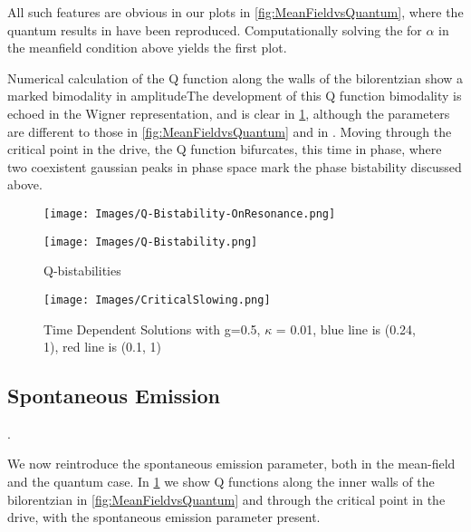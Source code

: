 All such features are obvious in our plots in \cref{fig:MeanFieldvsQuantum}, where the quantum results in \cite{Carmichael2015} have been reproduced. Computationally solving the for $\alpha$ in the meanfield condition above yields the first plot.

Numerical calculation of the Q function along the walls of the bilorentzian show a marked bimodality in amplitudeThe development of this Q function bimodality is echoed in the Wigner representation, and is clear in \cref{fig:Qbistabilities}, although the parameters are different to those in \cref{fig:MeanFieldvsQuantum} and in \autocite{Carmichael2015}. Moving through the critical point in the drive, the Q function bifurcates, this time in phase, where two coexistent gaussian peaks in phase space mark the phase bistability discussed above.
\begin{figure}[h]
 \begin{minipage}{.5\linewidth}
  \centering
  \texttt{[image: Images/Q-Bistability-OnResonance.png]}
  \end{minipage}%
  \begin{minipage}{.5\linewidth}
      \centering
      \texttt{[image: Images/Q-Bistability.png]}
  \end{minipage}
  \caption{Q-bistabilities}\label{fig:Qbistabilities}
\end{figure}

\begin{figure}[h]
  \centering
  \texttt{[image: Images/CriticalSlowing.png]}
  \caption{Time Dependent Solutions with g=0.5, $\kappa$ = 0.01, blue line is (0.24, 1), red line is (0.1, 1)}\label{fig:CriticalSlowing}
\end{figure}

\subsection{Spontaneous Emission}.

We now reintroduce the spontaneous emission parameter, both in the mean-field and the quantum case. In \ref{fig:Qbistabilities} we show Q functions along the inner walls of the bilorentzian in \ref{fig:MeanFieldvsQuantum} and through the critical point in the drive, with the spontaneous emission parameter present.


